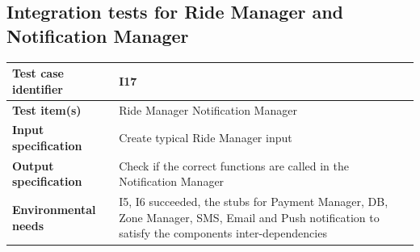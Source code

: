 \documentclass[a4paper,11pt]{report} %
\begin{document}
		\subsection{Integration tests for Ride Manager and Notification Manager}
			\begin{minipage}{\linewidth}
			\end{minipage}		
		\begin{center}
			\renewcommand{\arraystretch}{1.2}
			\setlength{\tabcolsep}{24pt}
			\begin{tabular}{ l  p{9cm}}\hline
				\textbf{Test case identifier} & I17\\\hline
				\textbf{Test item(s)} & Ride Manager \textrightarrow Notification Manager\\\hline
				\textbf{Input specification} & Create typical Ride Manager input \\\hline
				\textbf{Output specification} & Check if the correct functions are called in the Notification Manager\\\hline
				\textbf{Environmental needs} & I5, I6 succeeded, the stubs for Payment Manager, DB, Zone Manager, SMS, Email and Push notification to satisfy the components inter-dependencies\\\hline
			\end{tabular}
		\end{center}
		
\end{document}
